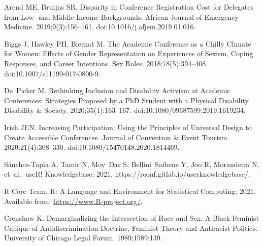 \documentclass[10pt,letterpaper]{article}
\begin{document}
%
\begin{thebibliography}{10}

Arend ME, Bruijns SR.
\newblock Disparity in Conference Registration Cost for Delegates from Low- and
  Middle-Income Backgrounds.
\newblock African Journal of Emergency Medicine. 2019;9(3):156--161.
\newblock doi:{10.1016/j.afjem.2019.01.016}.

Biggs J, Hawley PH, Biernat M.
\newblock The {{Academic Conference}} as a {{Chilly Climate}} for {{Women}}:
  Effects of {{Gender Representation}} on {{Experiences}} of {{Sexism}},
  {{Coping Responses}}, and {{Career Intentions}}.
\newblock Sex Roles. 2018;78(5):394--408.
\newblock doi:{10.1007/s11199-017-0800-9}.

De~Picker M.
\newblock Rethinking Inclusion and Disability Activism at Academic Conferences:
  Strategies Proposed by a {{PhD}} Student with a Physical Disability.
\newblock Disability \& Society. 2020;35(1):163--167.
\newblock doi:{10.1080/09687599.2019.1619234}.

Irish JEN.
\newblock Increasing Participation: Using the Principles of Universal Design to
  Create Accessible Conferences.
\newblock Journal of Convention \& Event Tourism. 2020;21(4):308--330.
\newblock doi:{10.1080/15470148.2020.1814469}.

{S{\'a}nchez-Tapia} A, Tamir N, Moy~Das S, Bellini~Saibene Y, Joo R, Morandeira
  N, et~al.. {{useR}}! {{Knowledgebase}}; 2021.
\newblock https://rconf.gitlab.io/userknowledgebase/.

{R Core Team}. R: A Language and Environment for Statistical Computing; 2021.
\newblock Available from: \url{https://www.R-project.org/}.

Crenshaw K.
\newblock Demarginalizing the {{Intersection}} of {{Race}} and {{Sex}}: A
  {{Black Feminist Critique}} of {{Antidiscrimination Doctrine}}, {{Feminist
  Theory}} and {{Antiracist Politics}}.
\newblock University of Chicago Legal Forum. 1989;1989:139.


\end{thebibliography}
\end{document}
